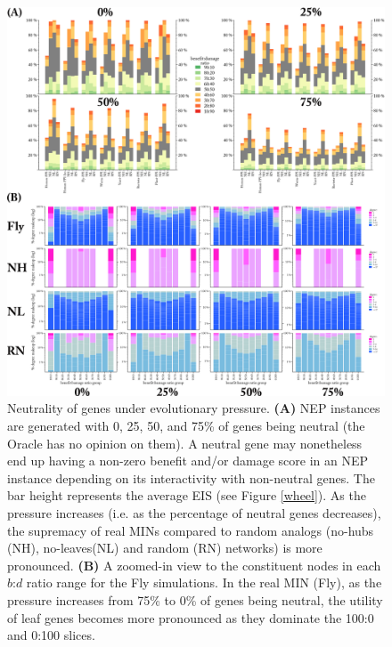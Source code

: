 \documentclass[12pt]{article}
\begin{document}
\begin{figure}[H]%
        \centering
                \includegraphics[width=1.0\textwidth]{Figure7.png}
                \singlespacing\caption
                {
                    Neutrality of genes under evolutionary pressure. \textbf{(A)} NEP instances are generated with 0, 25, 50, and 75\% of genes being neutral (the Oracle has no opinion on them). A neutral gene may nonetheless end up having a non-zero benefit and/or damage score in an NEP instance depending on its interactivity with non-neutral genes. The bar height represents the average EIS (see Figure \ref{wheel}). As the pressure increases (i.e. as the percentage of neutral genes decreases), the supremacy of real MINs compared to random analogs (no-hubs (NH), no-leaves(NL) and random (RN) networks) is more pronounced. \textbf{(B)} A zoomed-in view to the constituent nodes in each $b$:$d$ ratio range for the Fly simulations. In the real MIN (Fly), as the pressure increases from 75\% to 0\% of genes being neutral, the utility of leaf genes becomes more pronounced as they dominate the 100:0 and 0:100 slices.
                }
                \label{fig:neutrality}
\end{figure}
\end{document}
